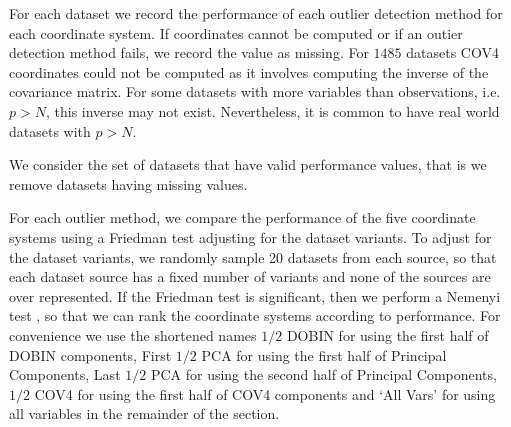 \documentclass[letter,12pt]{article}
\begin{document}
{\color{blue} For each dataset we record the performance of each outlier detection method for each coordinate system. If coordinates cannot be computed or if an outier detection method fails, we record the value as missing. For $1485$ datasets COV4 coordinates could not be computed as it involves computing the inverse of the covariance matrix. For some datasets with more variables than observations, i.e. $p > N$, this inverse may not exist.  Nevertheless, it is common to have real world datasets with $p > N$.

We consider the set of datasets that have valid performance values, that is we remove datasets having missing values.}  For each outlier method, we compare the performance of the {\color{blue}five} coordinate systems using a Friedman test adjusting for the dataset variants. To adjust for the dataset variants, we {\color{blue} randomly sample 20 datasets from each source, so that each dataset source has a fixed number of variants and none of the sources are over represented}. If the Friedman test is significant, then we perform a Nemenyi test {\color{blue} \citep{hollander2013nonparametric}}, so that we can rank the coordinate systems according to performance. For convenience we use the shortened names $1/2$ DOBIN for using the first half of DOBIN components, First $1/2$ PCA for using the first half of Principal Components, {\color{blue} Last $1/2$ PCA for using the second half of Principal Components, $1/2$ COV4 for using the first half of COV4 components }  and `All Vars' for using all variables in the remainder of the section.
\end{document}
